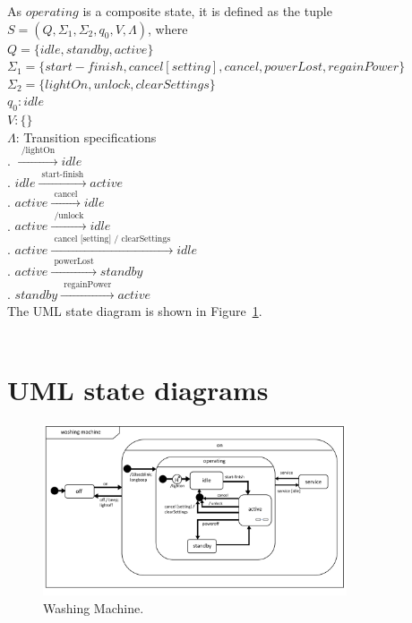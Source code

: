 \documentclass[12pt]{article}
\begin{document}
\begin{spacing}{1.5}
\noindent As $operating$ is a composite state, it is defined as the tuple $S = (Q, \Sigma_1, \Sigma_2, q_0, V, \Lambda)$, where\\

\noindent $Q = \{idle, standby, active\}$\\
\noindent $\Sigma_1 = \{start-finish, cancel [setting], cancel, powerLost, regainPower\}$\\
\noindent $\Sigma_2 = \{lightOn, unlock, clearSettings\}$\\
\noindent $q_0: idle$\\
\noindent $V: \{\}$\\
\noindent $\Lambda$: Transition specifications\\
. $\xrightarrow {\text { /lightOn }} idle$\\
. $idle \xrightarrow {\text { start-finish }} active$\\
. $active \xrightarrow {\text { cancel }} idle$\\
. $active \xrightarrow {\text { /unlock }} idle$\\
. $active \xrightarrow {\text { cancel [setting] / clearSettings }} idle$\\
. $active \xrightarrow {\text { powerLost }} standby$\\
. $standby \xrightarrow {\text { regainPower }} active$\\


\noindent The UML state diagram is shown in Figure~\ref{fig:wm-fig}.\\\\

\newpage

\section{UML state diagrams}

\begin{figure}[h!]
	\centering
		\includegraphics[width=0.8\textwidth]{./figures/a3-diagram-draft.pdf}
		  \caption{Washing Machine.}
  \label{fig:wm-fig}
\end{figure}

\end{spacing}
\end{document}
